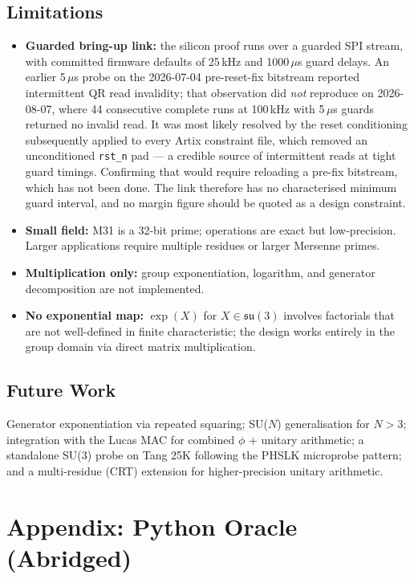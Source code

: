 \documentclass[conference]{IEEEtran}
\begin{document}
\subsection{Limitations}

\begin{itemize}
\item \textbf{Guarded bring-up link:} the silicon proof runs over a guarded
SPI stream, with committed firmware defaults of 25\,kHz and 1000\,$\mu$s guard
delays. An earlier 5\,$\mu$s probe on the 2026-07-04 pre-reset-fix bitstream
reported intermittent QR read invalidity; that observation did \emph{not}
reproduce on 2026-08-07, where 44 consecutive complete runs at 100\,kHz with
5\,$\mu$s guards returned no invalid read. It was most likely resolved by the
reset conditioning subsequently applied to every Artix constraint file, which
removed an unconditioned \texttt{rst\_n} pad --- a credible source of
intermittent reads at tight guard timings. Confirming that would require
reloading a pre-fix bitstream, which has not been done. The link therefore has
no characterised minimum guard interval, and no margin figure should be quoted
as a design constraint.
\item \textbf{Small field:} M31 is a 32-bit prime; operations are exact but
low-precision. Larger applications require multiple residues or larger
Mersenne primes.
\item \textbf{Multiplication only:} group exponentiation, logarithm, and
generator decomposition are not implemented.
\item \textbf{No exponential map:} $\exp(X)$ for
$X \in \mathfrak{su}(3)$ involves factorials that are not well-defined in
finite characteristic; the design works entirely in the group domain via
direct matrix multiplication.
\end{itemize}

\subsection{Future Work}

Generator exponentiation via repeated squaring; SU($N$) generalisation for
$N > 3$; integration with the Lucas MAC for combined $\phi$ + unitary
arithmetic; a standalone SU(3) probe on Tang 25K following the PHSLK
microprobe pattern; and a multi-residue (CRT) extension for
higher-precision unitary arithmetic.

\section*{Appendix: Python Oracle (Abridged)}
\end{document}

